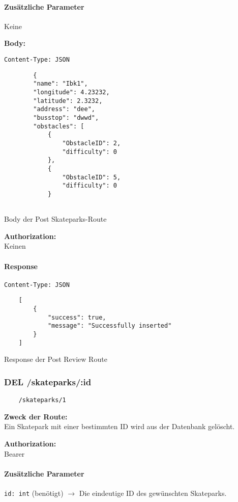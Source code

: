 \paragraph{Zusätzliche Parameter}
Keine


\textbf{Body:} \\
\begin{code}
    \lstinline{Content-Type: JSON}
    \begin{lstlisting}
        {
        "name": "Ibk1",
        "longitude": 4.23232,
        "latitude": 2.3232,
        "address": "dee",
        "busstop": "dwwd",
        "obstacles": [
            {
                "ObstacleID": 2,
                "difficulty": 0
            },
            {
                "ObstacleID": 5,
                "difficulty": 0
            }
        
    \end{lstlisting}
    \caption{Body der Post Skateparks-Route }
\end{code}

\textbf{Authorization:} \\
Keinen

\paragraph{Response }
\begin{code}
    \lstinline{Content-Type: JSON}
    \begin{lstlisting}
    [
        {
            "success": true,
            "message": "Successfully inserted"
        }
    ]
    \end{lstlisting}
    \caption{Response der Post Review Route}
\end{code}

\pagebreak


\subsubsection{DEL /skateparks/:id}

\begin{lstlisting}
    /skateparks/1
\end{lstlisting}

\textbf{Zweck der Route:} \\
Ein Skatepark mit einer bestimmten ID wird aus der Datenbank gelöscht.

\textbf{Authorization:} \\
Bearer

\paragraph{Zusätzliche Parameter}
\lstinline{id: int} (benötigt)
$\rightarrow$ Die eindeutige ID des gewünschten Skateparks.

